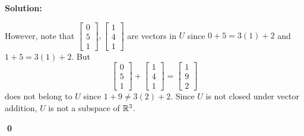 \documentclass{article}
\newenvironment{solution}
{
  \ignorespaces
  \textbf{Solution:}
}
{
  \ignorespacesafterend
  \begin{flushright}
  {\bfseries \qed}
  \end{flushright}
}
\begin{document}
\begin{solution}
However, note that
\(
  \begin{bmatrix} 0 \\ 5 \\ 1 \end{bmatrix},
  \begin{bmatrix} 1 \\ 4 \\ 1 \end{bmatrix}
\)
are vectors in \(U\) since \(0+5=3(1)+2\) and \(1+5=3(1)+2\).
But
\[
  \begin{bmatrix} 0 \\ 5 \\ 1 \end{bmatrix}
    +
  \begin{bmatrix} 1 \\ 4 \\ 1 \end{bmatrix}
    =
  \begin{bmatrix} 1 \\ 9 \\ 2 \end{bmatrix}
\]
does not belong to \(U\) since \(1+9\not=3(2)+2\).
Since \(U\) is not closed under vector addition, \(U\) is not a subspace
of \(\mathbb{R}^3\).
\end{solution}
\end{document}
